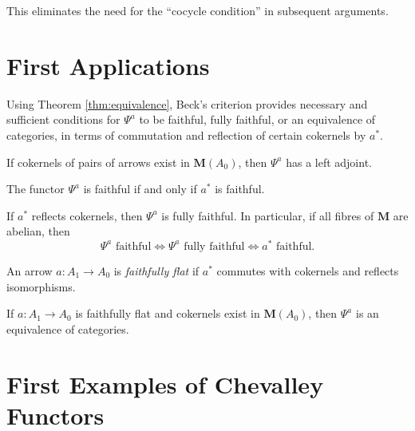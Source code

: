\documentclass{article}
\begin{document}
This eliminates the need for the ``cocycle condition'' in subsequent arguments.

\section{First Applications}

Using Theorem \ref{thm:equivalence}, Beck's criterion \cite{Linton1969} provides necessary and sufficient conditions for $\Psi^a$ to be faithful, fully faithful, or an equivalence of categories, in terms of commutation and reflection of certain cokernels by $a^*$.

\begin{proposition}
\label{prop:adj-left}
If cokernels of pairs of arrows exist in $\mathbf{M}(A_0)$, then $\Psi^a$ has a left adjoint.
\end{proposition}

\begin{proposition}
\label{prop:faithful}
The functor $\Psi^a$ is faithful if and only if $a^*$ is faithful.
\end{proposition}

\begin{proposition}
\label{prop:fully-faithful}
If $a^*$ reflects cokernels, then $\Psi^a$ is fully faithful. In particular, if all fibres of $\mathbf{M}$ are abelian, then
\[
\Psi^a \text{ faithful} \iff \Psi^a \text{ fully faithful} \iff a^* \text{ faithful}.
\]
\end{proposition}

\begin{definition}
\label{def:faithfully-flat}
An arrow $a : A_1 \to A_0$ is \emph{faithfully flat} if $a^*$ commutes with cokernels and reflects isomorphisms.
\end{definition}

\begin{proposition}
\label{prop:equivalence}
If $a : A_1 \to A_0$ is faithfully flat and cokernels exist in $\mathbf{M}(A_0)$, then $\Psi^a$ is an equivalence of categories.
\end{proposition}

\section{First Examples of Chevalley Functors}
\end{document}
